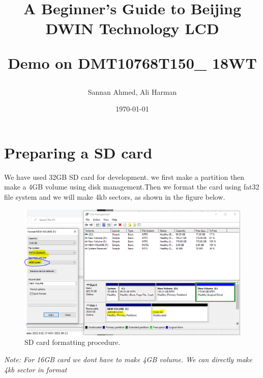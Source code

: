 \documentclass[12pt, A4]{article} %
\title{A Beginner's Guide to  Beijing DWIN Technology LCD 

Demo on DMT10768T150\_ 18WT}
\author{Sannan Ahmed, Ali Harman}
\date{\today} %
\begin{document}

\begin{titlepage}
\maketitle
\thispagestyle{empty} %
\end{titlepage}



\section{Preparing a SD card}

We have used 32GB SD card for development. we first make a partition then make a 4GB volume using disk management.Then we format the card using fat32 file system and we will make 4kb sectors, as shown in the figure below.\\


\begin{figure}[!htb] %
	\centering
	\includegraphics[width=15cm]{sdCard} 
	\caption{SD card formatting procedure.\\}
\end{figure}


\emph{\textit{Note: For 16GB card we dont have to make 4GB volume. We can directly make 4kb sector in format}}

\newpage
\end{document}

